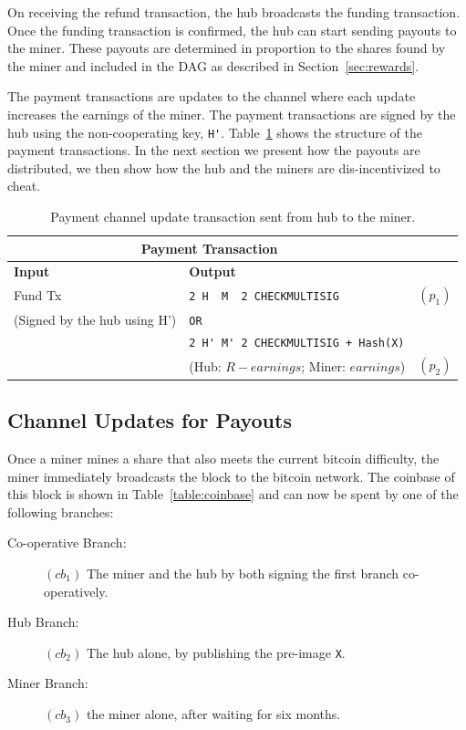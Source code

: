\documentclass{article}
\begin{document}
On receiving the refund transaction, the hub broadcasts the funding
transaction. Once the funding transaction is confirmed, the hub can
start sending payouts to the miner. These payouts are determined in
proportion to the shares found by the miner and included in the DAG as
described in Section~\ref{sec:rewards}.

The payment transactions are updates to the channel where each update
increases the earnings of the miner. The payment transactions are
signed by the hub using the non-cooperating key, \verb|H'|.
Table~\ref{payment-transaction} shows the structure of the payment
transactions. In the next section we present how the payouts are
distributed, we then show how the hub and the miners are
dis-incentivized to cheat.


\begin{table}
  \centering
  \begin{tabular}{ llr }
    \multicolumn{2}{c}{\bfseries Payment Transaction} \\
    \midrule
    \bfseries Input & \bfseries Output \\
    \midrule
    Fund Tx & \verb|2 H  M  2 CHECKMULTISIG| & $(p_1)$ \\
    (Signed by the hub using H') & \verb|OR| \\
                    & \verb|2 H' M' 2 CHECKMULTISIG + Hash(X)| \\
                    & (Hub: $R - earnings$; Miner: $earnings$) & $(p_2)$\\
    \midrule
  \end{tabular}
  \caption{Payment channel update transaction sent from hub to the
    miner.}\label{payment-transaction}
\end{table}

\subsection{Channel Updates for Payouts}\label{sec:channel-update}

Once a miner mines a share that also meets the current bitcoin
difficulty, the miner immediately broadcasts the block to the bitcoin
network. The coinbase of this block is shown in
Table~\ref{table:coinbase} and can now be spent by one of the following
branches:

\begin{description}
\item[Co-operative Branch:] $(cb_1)$ The miner and the hub by both signing the
  first branch co-operatively.
\item[Hub Branch:] $(cb_2)$ The hub alone, by publishing the pre-image \verb|X|.
\item[Miner Branch:] $(cb_3)$ the miner alone, after waiting for six months.
\end{description}
\end{document}

